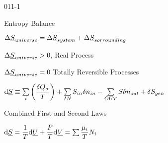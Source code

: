 \begin{mitframe}{011-1}
\begin{listone}
\begin{listtwo}
\begin{listthree}
			\end{listthree} 
   		
        \end{listtwo}
    
    	\item Entropy Balance
    
    	\begin{listtwo}
	
    		\item $\iipf\uline{\entropy}_{universe}=\iipf\uline{\entropy}_{system}+\iipf\uline{\entropy}_{sorrounding}$
    		  
            \begin{listthree}
	
    			\item $\iipf\uline{\entropy}_{universe}>0$, Real Process
    		    		
    			\item $\iipf\uline{\entropy}_{universe}=0 $ Totally Reversible Processes
    
			\end{listthree}  
    		
            \item$\mathrm{d}\uline{\entropy}\equiv\sum\limits_{\state}\bigg(\dfrac{\blthick\heatflow_{\molecrad}}{\Temp}\bigg)+\sum\limits_{IN}\entropy_{in}\blthick{n}_{in}-\sum\limits_{OUT}\entropy\blthick{n}_{out}+\blthick\entropy_{gen}$
        \end{listtwo}
        
        \item Combined First and Second Laws
    
    	\begin{listtwo}
	
    		\item $\mathrm{d}\uline{\entropy}=\dfrac{1}{\Temp}\mathrm{d}\uline{\uvel}+\dfrac{\p}{\Temp}\mathrm{d}\uline{\vol}=\sum\dfrac{\chempot_{\state}}{\Temp}\nummoles_{\state}$
    		  
        \end{listtwo}
    
	\end{listone}

\end{mitframe}